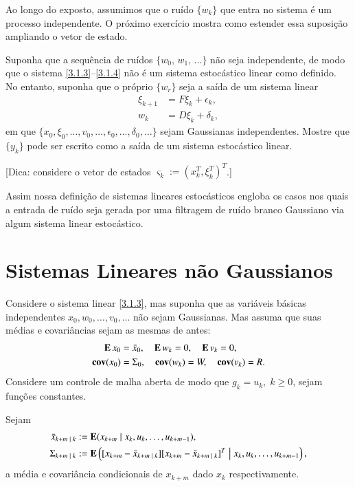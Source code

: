 Ao longo do exposto, assumimos que o ruído $\{w_k\}$ que entra no sistema é um processo independente. O próximo exercício mostra como estender essa suposição ampliando o vetor de estado.

\begin{Exercicio}\label{3.1.18}
Suponha que a sequência de ruídos $\{w_0,\,w_1,\,\dots\}$ não seja independente, de modo que o sistema \eqref{3.1.3}--\eqref{3.1.4} não é um sistema estocástico linear como definido. No entanto, suponha que o próprio $\{w_r\}$ seja a saída de um sistema linear
\begin{align*}
	\xi_{k+1} &= F \xi_k+\epsilon_k,\\
	w_k&=D \xi_k+\delta_k,
\end{align*}
em que $\{x_0,\xi_0,\dots,v_0,\dots,\epsilon_0,\dots,\delta_0,\dots\}$ sejam Gaussianas independentes. Mostre que $\{y_k\}$ pode ser escrito como a saída de um sistema estocástico linear.

[Dica: considere o vetor de estados $\varsigma_k:=(x_k^T,\xi_k^T)^T$.]
\end{Exercicio}

Assim nossa definição de sistemas lineares estocásticos engloba os casos nos quais a entrada de ruído seja  gerada por uma filtragem de ruído branco Gaussiano via algum sistema linear estocástico.





\section{Sistemas Lineares não Gaussianos}
Considere o sistema linear \eqref{3.1.3}, mas suponha que as variáveis básicas independentes $x_0,w_0,\dots,v_0,\dots$ não sejam Gaussianas. Mas assuma que suas médias e covariâncias sejam as mesmas de antes:
\[
\begin{aligned}
	\operatorname{\bf E} x_0&=\bar x_0, \quad \operatorname{\bf E} w_k = 0,
	\quad \operatorname{\bf E} v_k=0,\\
	\operatorname{\bf cov}(x_0)&=\Sigma_0, \quad \operatorname{\bf cov}(w_k)=W,
	\quad \operatorname{\bf cov}(v_k)=R.
\end{aligned}
\]
Considere um controle de malha aberta de modo que $g_k=u_k,\;k\ge0$, sejam funções constantes.

Sejam
\[
\begin{aligned}
	\bar x_{k+m\;|\;k}&:= \operatorname{\bf E}(x_{k+m}
	\;|\;x_k,u_k,\dots,u_{k+m-1}),\\
	\Sigma_{k+m\;|\;k}&:=
	\operatorname{\bf E}\left([x_{k+m}-\bar x_{k+m\;|\;k}]
	[x_{k+m}-\bar x_{k+m\;|\;k}]^T
	\;\big|\;x_k,u_k,\dots,u_{k+m-1}\right),
\end{aligned}
\]
a média e covariância condicionais de $x_{k+m}$ dado $x_k$ respectivamente.

